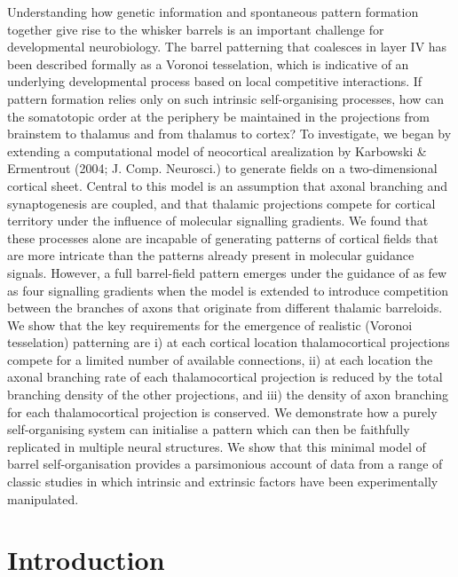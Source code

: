 \documentclass[a4paper,11pt]{article}
\begin{document}
Understanding how genetic information and spontaneous pattern formation
together give rise to the whisker barrels is an important challenge for
developmental neurobiology. The barrel patterning that coalesces in layer IV
has been described formally as a Voronoi tesselation, which is indicative of
an underlying developmental process based on local competitive
interactions. If pattern formation relies only on such intrinsic
self-organising processes, how can the somatotopic order at the periphery be
maintained in the projections from brainstem to thalamus and from thalamus to
cortex? To investigate, we began by extending a computational model of
neocortical arealization by Karbowski \& Ermentrout (2004; J. Comp. Neurosci.)
to generate fields on a two-dimensional cortical sheet. Central to this model
is an assumption that axonal branching and synaptogenesis are coupled, and
that thalamic projections compete for cortical territory under the influence
of molecular signalling gradients. We found that these processes alone are
incapable of generating patterns of cortical fields that are more intricate
than the patterns already present in molecular guidance signals. However, a
full barrel-field pattern emerges under the guidance of as few as four
signalling gradients when the model is extended to introduce competition
between the branches of axons that originate from different thalamic
barreloids. We show that the key requirements for the emergence of realistic
(Voronoi tesselation) patterning are i) at each cortical location
thalamocortical projections compete for a limited number of available
connections, ii) at each location the axonal branching rate of each
thalamocortical projection is reduced by the total branching density of the
other projections, and iii) the density of axon branching for each
thalamocortical projection is conserved. We demonstrate how a purely
self-organising system can initialise a pattern which can then be faithfully
replicated in multiple neural structures. We show that this minimal model of
barrel self-organisation provides a parsimonious account of data from a range
of classic studies in which intrinsic and extrinsic factors have been
experimentally manipulated.


\section*{Introduction}

\modulolinenumbers{}
\linenumbers
\end{document}
